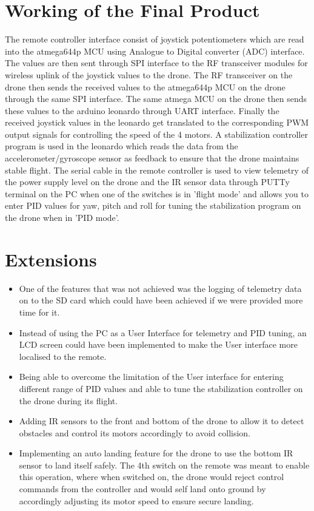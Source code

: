 \documentclass{article}
\begin{document}
\section{Working of the Final Product}
The remote controller interface consist of joystick potentiometers which are read into the atmega644p MCU using Analogue to Digital converter (ADC) interface. The values are then sent through SPI interface to the RF transceiver modules for wireless uplink of the joystick values to the drone. The RF transceiver on the drone then sends the received values to the atmega644p MCU on the drone through the same SPI interface. The same atmega MCU on the drone then sends these values to the arduino leonardo through UART interface. Finally the received joystick values in the leonardo get translated to the corresponding PWM output signals for controlling the speed of the 4 motors. A stabilization controller program is used in the leonardo which reads the data from the accelerometer/gyroscope sensor as feedback to ensure that the drone maintains stable flight. 
The serial cable in the remote controller is used to view telemetry of the power supply level on the drone and the IR sensor data through PUTTy terminal on the PC when one of the switches is in 'flight mode' and allows you to enter PID values for yaw, pitch and roll for tuning the stabilization program on the drone when in 'PID mode'.
\section{Extensions}
\begin{itemize}
    \item One of the features that was not achieved was the logging of telemetry data on to the SD card which could have been achieved if we were provided more time for it. 
    \item Instead of using the PC as a User Interface for telemetry and PID tuning, an LCD screen could have been implemented to make the User interface more localised to the remote.
    \item Being able to overcome the limitation of the User interface for entering different range of PID values and able to tune the stabilization controller on the drone during its flight.
    \item Adding IR sensors to the front and bottom of the drone to allow it to detect obstacles and control its motors accordingly to avoid collision.
    \item Implementing an auto landing feature for the drone to use the bottom IR sensor to land itself safely. The 4th switch on the remote was meant to enable this operation, where when switched on, the drone would reject control commands from the controller and would self land onto ground by accordingly adjusting its motor speed to ensure secure landing.
\end{itemize}
\end{document}
